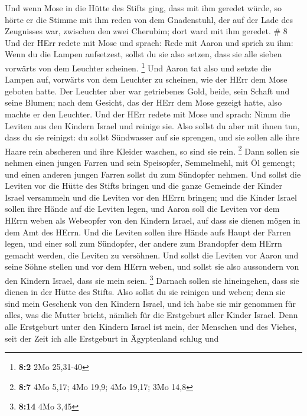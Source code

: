  Und wenn Mose in die Hütte des Stifts ging, dass mit ihm
geredet würde, so hörte er die Stimme mit ihm reden von dem Gnadenstuhl,
der auf der Lade des Zeugnisses war, zwischen den zwei Cherubim; dort
ward mit ihm geredet. \# 8  Und der HErr redete mit Mose und
sprach:  Rede mit Aaron und sprich zu ihm: Wenn du die
Lampen aufsetzest, sollst du sie also setzen, dass sie alle sieben
vorwärts von dem Leuchter scheinen. \footnote{\textbf{8:2} 2Mo 25,31-40}
 Und Aaron tat also und setzte die Lampen auf, vorwärts von
dem Leuchter zu scheinen, wie der HErr dem Mose geboten hatte.
 Der Leuchter aber war getriebenes Gold, beide, sein Schaft
und seine Blumen; nach dem Gesicht, das der HErr dem Mose gezeigt hatte,
also machte er den Leuchter.  Und der HErr redete mit Mose
und sprach:  Nimm die Leviten aus den Kindern Israel und
reinige sie.  Also sollst du aber mit ihnen tun, dass du sie
reinigst: du sollst Sündwasser auf sie sprengen, und sie sollen alle
ihre Haare rein abscheren und ihre Kleider waschen, so sind sie rein.
\footnote{\textbf{8:7} 4Mo 5,17; 4Mo 19,9; 4Mo 19,17; 3Mo 14,8}
 Dann sollen sie nehmen einen jungen Farren und sein
Speisopfer, Semmelmehl, mit Öl gemengt; und einen anderen jungen Farren
sollst du zum Sündopfer nehmen.  Und sollst die Leviten vor
die Hütte des Stifts bringen und die ganze Gemeinde der Kinder Israel
versammeln  und die Leviten vor den HErrn bringen; und die
Kinder Israel sollen ihre Hände auf die Leviten legen,  und
Aaron soll die Leviten vor dem HErrn weben als Webeopfer von den Kindern
Israel, auf dass sie dienen mögen in dem Amt des HErrn. 
Und die Leviten sollen ihre Hände aufs Haupt der Farren legen, und einer
soll zum Sündopfer, der andere zum Brandopfer dem HErrn gemacht werden,
die Leviten zu versöhnen.  Und sollst die Leviten vor Aaron
und seine Söhne stellen und vor dem HErrn weben,  und
sollst sie also aussondern von den Kindern Israel, dass sie mein seien.
\footnote{\textbf{8:14} 4Mo 3,45}  Darnach sollen sie
hineingehen, dass sie dienen in der Hütte des Stifts. Also sollst du sie
reinigen und weben;  denn sie sind mein Geschenk von den
Kindern Israel, und ich habe sie mir genommen für alles, was die Mutter
bricht, nämlich für die Erstgeburt aller Kinder Israel. 
Denn alle Erstgeburt unter den Kindern Israel ist mein, der Menschen und
des Viehes, seit der Zeit ich alle Erstgeburt in Ägyptenland schlug und
